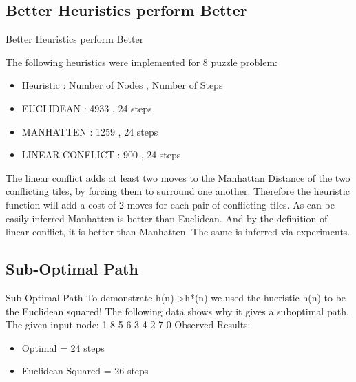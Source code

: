 \documentclass{beamer}
\begin{document}
\subsection{Better Heuristics perform Better}
\begin{frame}{Better Heuristics perform Better}

The following heuristics were implemented for 8 puzzle problem:
\begin{itemize}
\item Heuristic : Number of Nodes , Number of Steps
\item EUCLIDEAN : 4933 , 24 steps
\item MANHATTEN : 1259 , 24 steps
\item LINEAR CONFLICT : 900 , 24 steps 
\end{itemize}

The linear conflict adds at least two moves to the Manhattan Distance of the two conflicting tiles, by forcing them to surround one another. Therefore the heuristic function will add a cost of 2 moves for each pair of conflicting tiles.
\newline \newline
As can be easily inferred Manhatten is better than Euclidean. And by the definition of linear conflict, it is better than Manhatten.
\newline 
The same is inferred via experiments.
\end{frame}

\subsection{Sub-Optimal Path}
\begin{frame}{Sub-Optimal Path}
To demonstrate h(n)  \textgreater  h*(n) we used the hueristic h(n) to be the Euclidean squared! The following data shows why it gives a suboptimal path.
\newline \newline
The given input node: 1 8 5 6 3 4 2 7 0 
\newline \newline
Observed Results:
\begin{itemize}
\item Optimal = 24 steps
\item Euclidean Squared = 26 steps
\end{itemize}

\end{frame}
\end{document}
